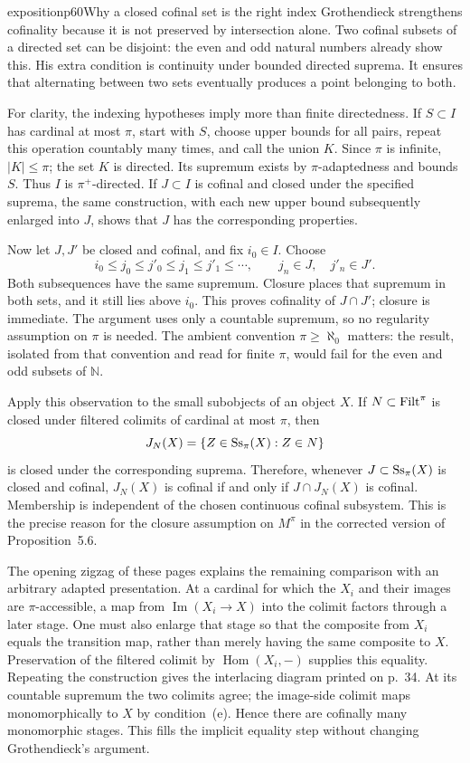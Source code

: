 \begin{dcomment}{exposition}{p60}{Why a closed cofinal set is the right index}
Grothendieck strengthens cofinality because it is not preserved by intersection alone. Two cofinal subsets of a directed set can be disjoint: the even and odd natural numbers already show this. His extra condition is continuity under bounded directed suprema. It ensures that alternating between two sets eventually produces a point belonging to both.

For clarity, the indexing hypotheses imply more than finite directedness. If $S\subset I$ has cardinal at most $\pi$, start with $S$, choose upper bounds for all pairs, repeat this operation countably many times, and call the union $K$. Since $\pi$ is infinite, $|K|\leq\pi$; the set $K$ is directed. Its supremum exists by $\pi$-adaptedness and bounds $S$. Thus $I$ is $\pi^+$-directed. If $J\subset I$ is cofinal and closed under the specified suprema, the same construction, with each new upper bound subsequently enlarged into $J$, shows that $J$ has the corresponding properties.

Now let $J,J'$ be closed and cofinal, and fix $i_0\in I$. Choose
\[
 i_0\leq j_0\leq j'_0\leq j_1\leq j'_1\leq\cdots,
 \qquad j_n\in J,\quad j'_n\in J'.
\]
Both subsequences have the same supremum. Closure places that supremum in both sets, and it still lies above $i_0$. This proves cofinality of $J\cap J'$; closure is immediate. The argument uses only a countable supremum, so no regularity assumption on $\pi$ is needed. The ambient convention $\pi\geq\aleph_0$ matters: the result, isolated from that convention and read for finite $\pi$, would fail for the even and odd subsets of $\mathbb N$.

Apply this observation to the small subobjects of an object $X$. If $N\subset\mathrm{Filt}^\pi$ is closed under filtered colimits of cardinal at most $\pi$, then
\[
 J_N(X)=\{Z\in\mathrm{Ss}_\pi(X):Z\in N\}
\]
is closed under the corresponding suprema. Therefore, whenever $J\subset\mathrm{Ss}_\pi(X)$ is closed and cofinal, $J_N(X)$ is cofinal if and only if $J\cap J_N(X)$ is cofinal. Membership is independent of the chosen continuous cofinal subsystem. This is the precise reason for the closure assumption on $M^\pi$ in the corrected version of Proposition~5.6.

The opening zigzag of these pages explains the remaining comparison with an arbitrary adapted presentation. At a cardinal for which the $X_i$ and their images are $\pi$-accessible, a map from $\operatorname{Im}(X_i\to X)$ into the colimit factors through a later stage. One must also enlarge that stage so that the composite from $X_i$ equals the transition map, rather than merely having the same composite to $X$. Preservation of the filtered colimit by $\operatorname{Hom}(X_i,-)$ supplies this equality. Repeating the construction gives the interlacing diagram printed on p.~34. At its countable supremum the two colimits agree; the image-side colimit maps monomorphically to $X$ by condition~(e). Hence there are cofinally many monomorphic stages. This fills the implicit equality step without changing Grothendieck's argument.
\end{dcomment}


